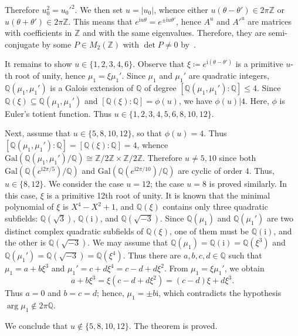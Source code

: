 \documentclass[11pt,a4paper]{article}
\theoremstyle{plain}
\theoremstyle{remark}
\theoremstyle{custombold}
\newcommand{\irm}{\mathrm{i}}
\begin{document}
        Therefore $u_0^2=u_0'^2$. We then set $u=|u_0|$, whence either $u(\theta-\theta')\in 2\pi\mathbb Z$ or $u(\theta+\theta')\in 2\pi\mathbb Z$. This means that $e^{\irm u\theta}=e^{\pm\irm u\theta'}$, hence
        $A^{u}$ and $A'^{u}$ are matrices with coefficients in $\mathbb Z$ and with the same eigenvalues. Therefore, they are semi-conjugate by some $P\in M_2(\mathbb Z)$ with $\det P\neq0$ by~\cite[A.VII.33 Corollary~3]{Bourbaki-algebraII}. 

        It remains to show $u\in\{1,2,3,4,6\}$. Observe that $\xi\coloneqq e^{\irm (\theta-\theta')}$ is a primitive $u$-th root of unity, hence $\mu_1=\xi\mu_1'$. Since $\mu_1$ and $\mu_1'$ are quadratic integers, $\mathbb Q(\mu_1,\mu_1')$ is a Galois extension of $\mathbb Q$ of degree $[\mathbb Q(\mu_1,\mu_1'):\mathbb Q]\leq4$. Since $\mathbb Q(\xi)\subseteq\mathbb Q(\mu_1,\mu_1')$ and $[\mathbb Q(\xi):\mathbb Q]=\phi(u)$, we have $\phi(u)|4$. Here, $\phi$ is Euler's totient function. Thus $u\in\{1,2,3,4,5,6,8,10,12\}$. 
        
        Next, assume that $u\in\{5,8,10,12\}$, so that $\phi(u)=4$. Thus $[\mathbb Q(\mu_1,\mu_1'):\mathbb Q]=[\mathbb Q(\xi):\mathbb Q]=4$, whence $\mathrm{Gal}(\mathbb Q(\mu_1,\mu_1')/\mathbb Q)\cong\mathbb Z/2\mathbb Z\times\mathbb Z/2\mathbb Z$. Therefore $u\neq 5,10$ since both  $\mathrm{Gal}(\mathbb Q(e^{\irm 2\pi/5})/\mathbb Q)$ and $\mathrm{Gal}(\mathbb Q(e^{\irm 2\pi/10})/\mathbb Q)$ are cyclic of order $4$. Thus, $u\in\{8,12\}$. We consider the case $u=12$; the case $u=8$ is proved similarly. In this case, $\xi$ is a primitive 12th root of unity. It is known that the minimal polynomial of $\xi$ is $X^4-X^2+1$, and $\mathbb Q(\xi)$ contains only three quadratic subfields: $\mathbb Q(\sqrt{3})$, $\mathbb Q(\irm)$, and $\mathbb Q(\sqrt{-3})$. Since $\mathbb Q(\mu_1)$ and $\mathbb Q(\mu_1')$ are two distinct complex quadratic subfields of $\mathbb Q(\xi)$, one of them must be $\mathbb Q(\irm)$, and the other is $\mathbb Q(\sqrt{-3})$. We may assume that $\mathbb Q(\mu_1)=\mathbb Q(\irm)=\mathbb Q(\xi^3)$ and $\mathbb Q(\mu_1')=\mathbb Q(\sqrt{-3})=\mathbb Q(\xi^4)$. Thus there are $a,b,c,d\in\mathbb Q$ such that $\mu_1=a+b\xi^3$ and $\mu_1'=c+d\xi^4=c-d+d\xi^2$. From $\mu_1=\xi\mu_1'$, we obtain
        $$a+b\xi^3=\xi(c-d+d\xi^2)=(c-d)\xi+d\xi^3.$$
        Thus $a=0$ and $b=c=d$; hence, $\mu_1=\pm b\irm$, which contradicts the hypothesis $\arg\mu_1\not\in2\pi\mathbb Q$.
        
        We conclude that $u\not\in\{5,8,10,12\}$. The theorem is proved.
\end{document}
